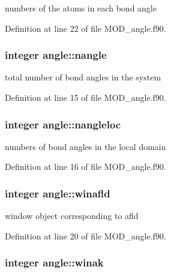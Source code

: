 numbers of the atoms in each bond angle 



Definition at line 22 of file M\-O\-D\-\_\-angle.\-f90.

\hypertarget{classangle_a401aae16b66326a502f845b4697902b1}{
\subsubsection[{nangle}]{\setlength{\rightskip}{0pt plus 5cm}integer angle\-::nangle}}\label{classangle_a401aae16b66326a502f845b4697902b1}


total number of bond angles in the system 



Definition at line 15 of file M\-O\-D\-\_\-angle.\-f90.

\hypertarget{classangle_a4707c3874420f6c094c961bd2d798f11}{
\subsubsection[{nangleloc}]{\setlength{\rightskip}{0pt plus 5cm}integer angle\-::nangleloc}}\label{classangle_a4707c3874420f6c094c961bd2d798f11}


numbers of bond angles in the local domain 



Definition at line 16 of file M\-O\-D\-\_\-angle.\-f90.

\hypertarget{classangle_a5d36413fbeccef4bfce525004cb0ce6e}{
\subsubsection[{winafld}]{\setlength{\rightskip}{0pt plus 5cm}integer angle\-::winafld}}\label{classangle_a5d36413fbeccef4bfce525004cb0ce6e}


window object corresponding to afld 



Definition at line 20 of file M\-O\-D\-\_\-angle.\-f90.

\hypertarget{classangle_a4d5150f5ef2c908ca41d79ffa47bef99}{
\subsubsection[{winak}]{\setlength{\rightskip}{0pt plus 5cm}integer angle\-::winak}}\label{classangle_a4d5150f5ef2c908ca41d79ffa47bef99}


